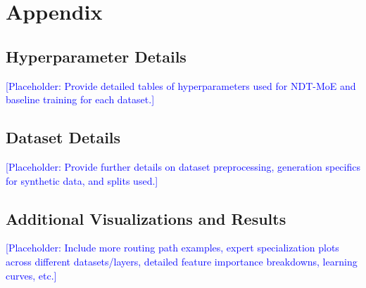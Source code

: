 \documentclass[11pt,a4paper]{article}
\newcommand{\placeholder}[1]{\textcolor{blue}{[Placeholder: #1]}}
\begin{document}
\appendix
\section{Appendix}

\subsection{Hyperparameter Details}
\label{app:hyperparams}
\placeholder{Provide detailed tables of hyperparameters used for NDT-MoE and baseline training for each dataset.}

\subsection{Dataset Details}
\label{app:datasets}
\placeholder{Provide further details on dataset preprocessing, generation specifics for synthetic data, and splits used.}

\subsection{Additional Visualizations and Results}
\label{app:extra_results}
\placeholder{Include more routing path examples, expert specialization plots across different datasets/layers, detailed feature importance breakdowns, learning curves, etc.}
\end{document}
